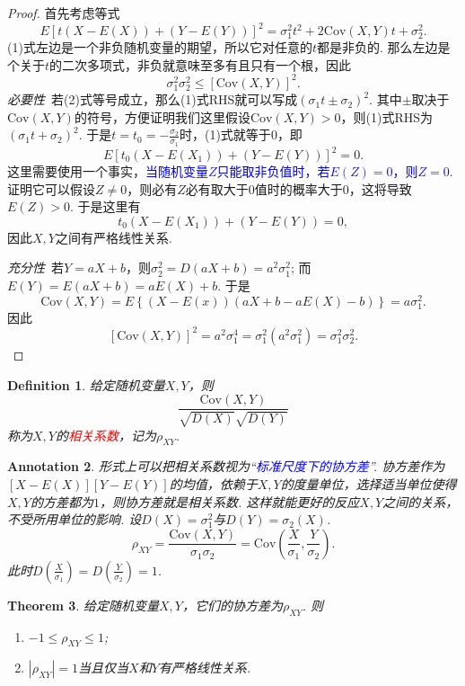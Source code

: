 \documentclass{article}
\newtheorem{theorem}{Theorem}[section]
\newtheorem{definition}[theorem]{Definition}
\newtheorem{annotation}[theorem]{Annotation}
\newcommand{\redt}[1]{\textcolor{red}{#1}}
\newcommand{\bluet}[1]{\textcolor{blue}{#1}}
\begin{document}
\begin{proof}
首先考虑等式
\begin{equation}
E\left[t(X-E(X)) + (Y-E(Y))\right]^2 = \sigma_1^2t^2 + 2\text{Cov}(X,Y)t + \sigma_2^2.
\end{equation}
(1)式左边是一个非负随机变量的期望，所以它对任意的$t$都是非负的. 那么左边是个关于$t$的二次多项式，非负就意味至多有且只有一个根，因此
\begin{equation}
\sigma_1^2\sigma_2^2 \leq \left[\text{Cov}(X,Y)\right]^2.
\end{equation}
\emph{必要性}\ 若(2)式等号成立，那么(1)式RHS就可以写成$(\sigma_1t \pm \sigma_2)^2$. 其中$\pm$取决于$\text{Cov}(X,Y)$的符号，方便证明我们这里假设$\text{Cov}(X,Y) > 0$，则(1)式RHS为$(\sigma_1t +\sigma_2)^2$. 于是$t=t_0=-\frac{\sigma_2}{\sigma_1}$时，(1)式就等于$0$，即
$$
E\left[t_0(X-E(X_1)) + (Y-E(Y))\right]^2 = 0.
$$
这里需要使用一个事实，\bluet{当随机变量$Z$只能取非负值时，若$E(Z) = 0$，则$Z=0$}. 证明它可以假设$Z \neq 0$，则必有$Z$必有取大于$0$值时的概率大于$0$，这将导致$E(Z) > 0$. 于是这里有
$$
t_0(X-E(X_1)) + (Y-E(Y)) = 0,
$$
因此$X,Y$之间有严格线性关系.

\emph{充分性}\ 若$Y=aX+b$，则$\sigma_2^2 = D(aX+b)=a^2\sigma_1^2$; 而$E(Y) = E(aX+b) = aE(X)+b$. 于是
$$
\text{Cov}(X,Y) = E\left\{(X-E(x))(aX+b-aE(X)-b)\right\} = a\sigma_1^2.
$$
因此
$$
[\text{Cov}(X,Y)]^2  =a^2\sigma_1^4=\sigma_1^2(a^2\sigma_1^2) =\sigma_1^2\sigma_2^2.
$$
\end{proof}

\begin{definition}
\rm 给定随机变量$X,Y$，则
$$
\frac{\text{Cov}(X,Y)}{\sqrt{D(X)}\sqrt{D(Y)}}
$$
称为$X,Y$的\redt{相关系数}，记为$\rho_{XY}$.
\end{definition}

\begin{annotation}
\rm 形式上可以把相关系数视为“\bluet{标准尺度下的协方差}”. 协方差作为$[X-E(X)][Y-E(Y)]$的均值，依赖于$X,Y$的度量单位，选择适当单位使得$X,Y$的方差都为$1$，则协方差就是相关系数. 这样就能更好的反应$X,Y$之间的关系，不受所用单位的影响. 设$D(X)=\sigma_1^2$与$D(Y)=\sigma_2(X)$.
$$
\rho_{XY}=\frac{\text{Cov}(X,Y)}{\sigma_1\sigma_2} = \text{Cov}(\frac{X}{\sigma_1},\frac{Y}{\sigma_2}).
$$
此时$D(\frac{X}{\sigma_1})=D(\frac{Y}{\sigma_2}) = 1$.
\end{annotation}

\begin{theorem}
\rm 给定随机变量$X,Y$，它们的协方差为$\rho_{XY}$. 则
\begin{enumerate}
	\item $ -1 \leq \rho_{XY} \leq 1$;
	\item $|\rho_{XY}| = 1$当且仅当$X$和$Y$有严格线性关系. 
\end{enumerate} 
\end{theorem}
\end{document}
